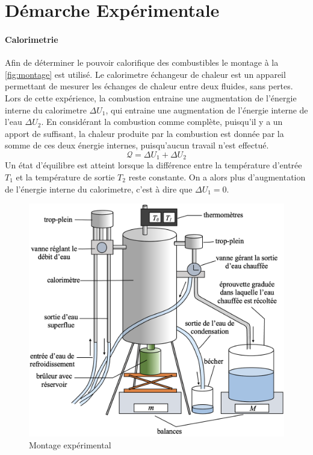 \section{Démarche Expérimentale}

\paragraph*{Calorimetrie}
Afin de déterminer le pouvoir calorifique des combustibles le montage à la \autoref{fig:montage} est utilisé. Le calorimetre échangeur de chaleur est un appareil permettant de mesurer les échanges de chaleur entre deux fluides, sans pertes. Lors de cette expérience, la combustion entraine une augmentation de l'énergie interne du calorimetre \(\Delta U_1\), qui entraine une augmentation de l'énergie interne de l'eau \(\Delta U_2\). En considérant la combustion comme complète, puisqu'il y a un apport de  suffisant, la chaleur produite par la combustion est donnée par la somme de ces deux énergie internes, puisqu'aucun travail n'est effectué.
\begin{equation}
    \mathcal{Q} = \Delta U_1 + \Delta U_2
\end{equation}
Un état d'équilibre est atteint lorsque la différence entre la température d'entrée \(T_1\) et la température de sortie \(T_2\) reste constante. On a alors plus d'augmentation de l'énergie interne du calorimetre, c'est à dire que \(\Delta U_1 = 0\).

\begin{figure}[h]
    \centering
    \includegraphics[width=0.7\linewidth]{figures/montage.png}
    \caption{Montage expérimental \cite{rapport-mendels-pascaud}}
    \label{fig:montage}
\end{figure}

